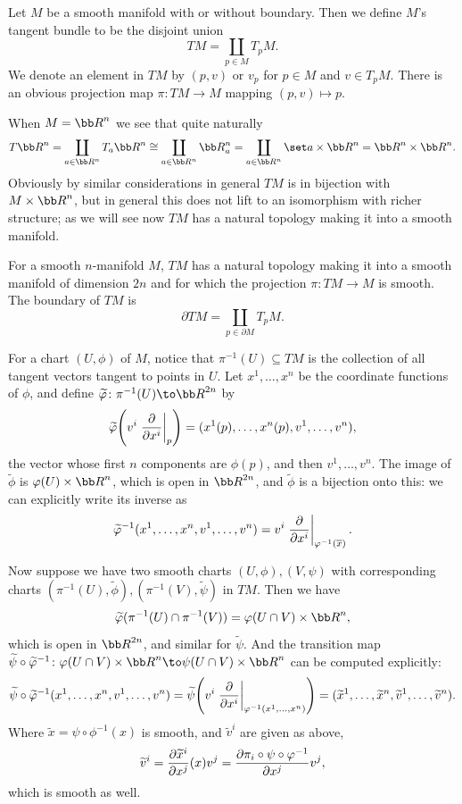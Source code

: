 \bdefn

    Let $M$ be a smooth manifold with or without boundary.
    Then we define $M$'s {\emphcolor tangent bundle} to be the disjoint union
    $$ TM = \coprod_{p\in M}T_pM . $$
    We denote an element in $TM$ by $(p,v)$ or $v_p$ for $p\in M$ and $v\in T_pM$.
    There is an obvious {\emphcolor projection map} $\pi\colon TM\to M$ mapping $(p,v)\mapsto p$.

\edefn

When $M=\bR^n$ we see that quite naturally
$$ T\bR^n = \coprod_{a\in\bR^n}T_a\bR^n \cong \coprod_{a\in\bR^n}\bR^n_a = \coprod_{a\in\bR^n}\set a\times\bR^n = \bR^n\times\bR^n . $$
Obviously by similar considerations in general $TM$ is in bijection with $M\times\bR^n$, but in general this does not lift to an isomorphism with richer structure;
as we will see now $TM$ has a natural topology making it into a smooth manifold.

\bprop

    For a smooth $n$-manifold $M$, $TM$ has a natural topology making it into a smooth manifold of dimension $2n$ and for which
    the projection $\pi\colon TM\to M$ is smooth.
    The boundary of $TM$ is
    $$ \partial TM = \coprod_{p\in\partial M}T_pM . $$

\eprop

\bproof

    For a chart $(U,\phi)$ of $M$, notice that $\pi^{-1}(U)\subseteq TM$ is the collection of all tangent vectors tangent to points in $U$.
    Let $x^1,\dots,x^n$ be the coordinate functions of $\phi$, and define $\tilde\phi\colon\pi^{-1}(U)\to\bR^{2n}$ by
    $$ \widetilde{\varphi}\mathopen{}\mathclose{\left(v^i\left.{{\partial }\over{\partial x^i}}\right|_p\right)} = (x^1(p),\dots,x^n(p),v^1,\dots,v^n) , $$
    the vector whose first $n$ components are $\phi(p)$, and then $v^1,\dots,v^n$.
    The image of $\tilde\phi$ is $\phi(U)\times\bR^n$, which is open in $\bR^{2n}$, and $\tilde\phi$ is a bijection onto this: we can explicitly
    write its inverse as
    $$ \widetilde{\varphi}^{-1}(x^1,\dots,x^n,v^1,\dots,v^n) = v^i\left.{{\partial }\over{\partial x^i}}\right|_{\varphi^{-1}(\overline x)} . $$

    Now suppose we have two smooth charts $(U,\phi),(V,\psi)$ with corresponding charts $(\pi^{-1}(U),\tilde\phi),(\pi^{-1}(V),\tilde\psi)$ in $TM$.
    Then we have
    $$ \tilde\phi(\pi^{-1}(U)\cap\pi^{-1}(V)) = \phi(U\cap V)\times\bR^n , $$
    which is open in $\bR^{2n}$, and similar for $\tilde\psi$.
    And the transition map $\tilde\psi\circ\tilde\phi^{-1}\colon\phi(U\cap V)\times\bR^n\to\psi(U\cap V)\times\bR^n$ can be computed explicitly:
    $$ \widetilde\psi\circ\widetilde{\varphi}^{-1}(x^1,\dots,x^n,v^1,\dots,v^n) = \widetilde\psi\mathopen{}\mathclose{\left(v^i\left.{{\partial }\over{\partial x^i}}\right|_{\varphi^{-1}(x^1,\dots,x^n)}\right)} =
    (\widetilde x^1,\dots,\widetilde x^n,\widetilde v^1,\dots,\widetilde v^n) . $$
    Where $\tilde x=\psi\circ\phi^{-1}(x)$ is smooth, and $\tilde v^i$ are given as above,
    $$ \widetilde v^i = {{\partial \widetilde x^i}\over{\partial x^j}}(x)v^j = {{\partial \pi_i\circ\psi\circ\varphi^{-1}}\over{\partial x^j}}v^j , $$
    which is smooth as well.

